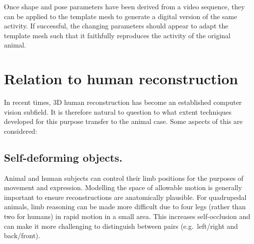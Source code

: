 Once shape and pose parameters have been derived from a video sequence, they can be applied to the template mesh to generate a digital version of the same activity. If successful, the changing parameters should appear to adapt the template mesh such that it faithfully reproduces the activity of the original animal. 


\section{Relation to human reconstruction}
In recent times, 3D human reconstruction has become an established computer vision subfield. It is therefore natural to question to what extent techniques developed for this purpose transfer to the animal case. Some aspects of this are considered:



\subsection{Self-deforming objects.} Animal and human subjects can control their limb positions for the purposes of movement and expression. Modelling the space of allowable motion is generally important to ensure reconstructions are anatomically plausible. For quadrupedal animals, limb reasoning can be made more difficult due to four legs (rather than two for humans) in rapid motion in a small area. This increases self-occlusion and can make it more challenging to distinguish between pairs (e.g.\ left/right and back/front).

